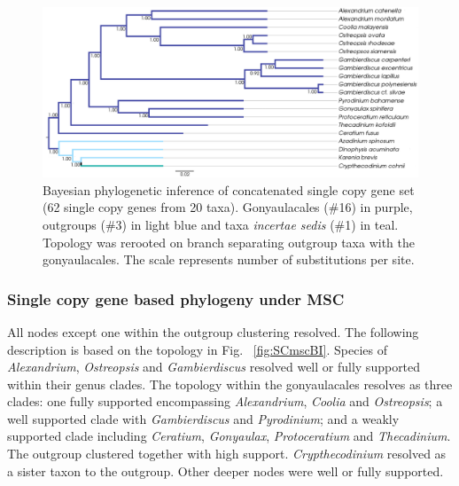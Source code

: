 \documentclass[12pt]{article}
\begin{document}
\begin{figure} 
\includegraphics[scale=.34]{figures/SC-concat-BI.png} 
\caption{Bayesian phylogenetic inference of concatenated single copy gene set (62 single copy genes from 20 taxa). Gonyaulacales (\#16) in purple, outgroups (\#3) in light blue and taxa \textit{incertae sedis} (\#1) in teal. Topology was rerooted on branch separating outgroup taxa with the gonyaulacales. The scale represents number of substitutions per site.} 
\label{fig:SCconcatBI}
\end{figure} 
\FloatBarrier

\subsubsection*{Single copy gene based phylogeny under MSC}
\FloatBarrier 
All nodes except one within the outgroup clustering resolved.
The following description is based on the topology in Fig. ~\ref{fig:SCmscBI}. 
Species of \emph{Alexandrium}, \emph{Ostreopsis} and \emph{Gambierdiscus} resolved well or fully supported within their genus clades. 
The topology within the gonyaulacales resolves as three clades: 
one fully supported encompassing \emph{Alexandrium}, \emph{Coolia} and \emph{Ostreopsis};
a well supported clade with \emph{Gambierdiscus} and \emph{Pyrodinium}; 
and a weakly supported clade including \emph{Ceratium}, \emph{Gonyaulax}, \emph{Protoceratium} and \emph{Thecadinium}. 
The outgroup clustered together with high support. 
\emph{Crypthecodinium} resolved as a sister taxon to the outgroup. 
Other deeper nodes were well or fully supported.
\end{document}

